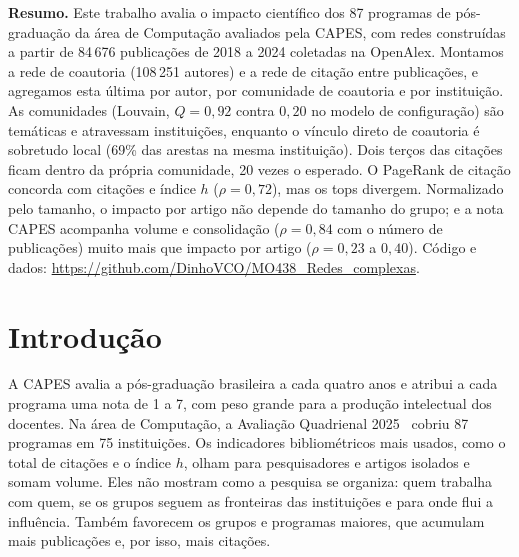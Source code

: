 \documentclass[12pt]{projeto}
\begin{document}
\renewcommand{\tablename}{Tabela}
\renewcommand{\figurename}{Figura}
\setlength{\abovecaptionskip}{4pt}
\setlength{\textfloatsep}{10pt plus 2pt minus 2pt}
\setlength{\floatsep}{8pt plus 2pt minus 2pt}
\renewcommand{\topfraction}{0.85}
\renewcommand{\bottomfraction}{0.6}
\renewcommand{\textfraction}{0.1}
\renewcommand{\floatpagefraction}{0.8}

\noindent\textbf{Resumo.} Este trabalho avalia o impacto científico dos 87 programas de pós-graduação da área de Computação avaliados pela CAPES, com redes construídas a partir de 84\,676 publicações de 2018 a 2024 coletadas na OpenAlex. Montamos a rede de coautoria (108\,251 autores) e a rede de citação entre publicações, e agregamos esta última por autor, por comunidade de coautoria e por instituição. As comunidades (Louvain, $Q = 0{,}92$ contra $0{,}20$ no modelo de configuração) são temáticas e atravessam instituições, enquanto o vínculo direto de coautoria é sobretudo local (69\% das arestas na mesma instituição). Dois terços das citações ficam dentro da própria comunidade, 20 vezes o esperado. O PageRank de citação concorda com citações e índice $h$ ($\rho = 0{,}72$), mas os tops divergem. Normalizado pelo tamanho, o impacto por artigo não depende do tamanho do grupo; e a nota CAPES acompanha volume e consolidação ($\rho = 0{,}84$ com o número de publicações) muito mais que impacto por artigo ($\rho = 0{,}23$ a $0{,}40$). Código e dados: \url{https://github.com/DinhoVCO/MO438_Redes_complexas}.

\section{Introdução}

A CAPES avalia a pós-graduação brasileira a cada quatro anos e atribui a cada programa uma nota de 1 a 7, com peso grande para a produção intelectual dos docentes. Na área de Computação, a Avaliação Quadrienal 2025~\cite{capes2025} cobriu 87 programas em 75 instituições. Os indicadores bibliométricos mais usados, como o total de citações e o índice $h$, olham para pesquisadores e artigos isolados e somam volume. Eles não mostram como a pesquisa se organiza: quem trabalha com quem, se os grupos seguem as fronteiras das instituições e para onde flui a influência. Também favorecem os grupos e programas maiores, que acumulam mais publicações e, por isso, mais citações.
\end{document}
